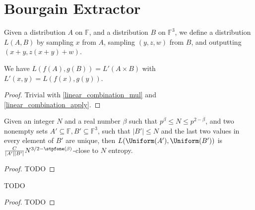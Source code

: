 \chapter{Bourgain Extractor}
\label{chap:bourgain}

\begin{definition}
    \label{lapply}
    \leanok
    Given a distribution $A$ on $\mathbb{F}$, and a distribution $B$ on $\mathbb{F}^3$, we define a distribution $L(A, B)$
    by sampling $x$ from $A$, sampling $(y, z, w)$ from $B$, and outputting
    $(x + y, z(x + y) + w)$.
\end{definition}

\begin{lemma}
    \label{lapply_linear_combination}
    \leanok
    We have $L(f(A), g(B)) = L'(A\times B)$ with $L'(x, y) = L(f(x), g(y))$.
\end{lemma}

\begin{proof}
    \leanok
    Trivial with \ref{linear_combination_mul} and \ref{linear_combination_apply}.
\end{proof}

\begin{theorem}
    \label{line_point_large_l2_aux}
    \leanok
    Given an integer $N$ and a real number $\beta$ such that $p^\beta \leq N \leq p^{2 - \beta}$, and
    two nonempty sets $A' \subseteq \mathbb{F}, B'\subseteq \mathbb{F}^3$, such that $|B'| \leq N$ and 
    the last two values in every element of $B'$ are unique, then
    $L(\Uniform(A'), \Uniform(B'))$ is $\frac{C}{|A'| |B'|} N^{3/2 - \stpfone(\beta)}$-close to $N$ entropy.
\end{theorem}

\begin{proof}
    \leanok
    TODO
\end{proof}

\begin{theorem}
    \label{line_point_large_l2t}
    \leanok
    TODO
\end{theorem}

\begin{proof}
    \leanok
    TODO
\end{proof}

